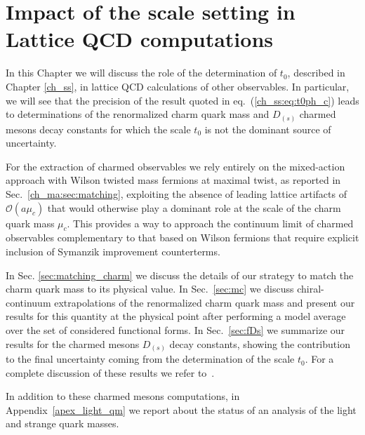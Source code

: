 \chapter{Impact of the scale setting in Lattice QCD computations}
\label{ch_charm}



In this Chapter we will discuss the role of the determination of $t_0$, described in Chapter \ref{ch_ss}, in lattice QCD calculations of other observables. In particular, we will see that the precision of the result quoted in eq.~(\ref{ch_ss:eq:t0ph_c}) leads to determinations of the renormalized charm quark mass and $D_{(s)}$ charmed mesons decay constants for which the scale $t_0$ is not the dominant source of uncertainty. 

For the extraction of charmed observables we rely entirely on the mixed-action approach with Wilson twisted mass fermions at maximal twist, as reported in Sec.~\ref{ch_ma:sec:matching}, exploiting the absence of leading lattice artifacts of $\mathcal{O}(a\mu_c)$ that would otherwise play a dominant role at the scale of the charm quark mass $\mu_c$. This provides a way to approach the continuum limit of charmed observables complementary to that based on Wilson fermions that require explicit inclusion of Symanzik improvement counterterms.

In Sec. \ref{sec:matching_charm} we discuss the details of our strategy to match the charm quark mass to its physical value. In Sec.~\ref{sec:mc} we discuss chiral-continuum extrapolations of the renormalized charm quark mass and present our results for this quantity at the physical point after performing a model average over the set of considered functional forms. In Sec.~\ref{sec:fDs} we summarize our results for the charmed mesons $D_{(s)}$ decay constants, showing the contribution to the final uncertainty coming from the determination of the scale $t_0$. For a complete discussion of these results we refer to~\citep{charm}. 

In addition to these charmed mesons computations, in Appendix~\ref{apex_light_qm} we report about the status of an analysis of the light and strange quark masses. 


